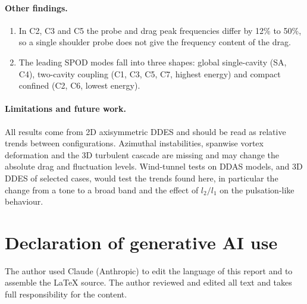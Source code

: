\documentclass[11pt,a4paper]{article}
\newcommand{\ltl}{l_2/l_1}
\begin{document}
\paragraph{Other findings.}
\begin{enumerate}
  \item In C2, C3 and C5 the probe and drag peak frequencies differ by 12\% to 50\%, so a single shoulder probe does not give the frequency content of the drag.
  \item The leading SPOD modes fall into three shapes: global single-cavity (SA, C4), two-cavity coupling (C1, C3, C5, C7, highest energy) and compact confined (C2, C6, lowest energy).
\end{enumerate}

\paragraph{Limitations and future work.} All results come from 2D axisymmetric DDES and should be read as relative trends between configurations. Azimuthal instabilities, spanwise vortex deformation and the 3D turbulent cascade are missing and may change the absolute drag and fluctuation levels. Wind-tunnel tests on DDAS models, and 3D DDES of selected cases, would test the trends found here, in particular the change from a tone to a broad band and the effect of $\ltl$ on the pulsation-like behaviour.

\section*{Declaration of generative AI use}
The author used Claude (Anthropic) to edit the language of this report and to assemble the LaTeX source. The author reviewed and edited all text and takes full responsibility for the content.



\end{document}
